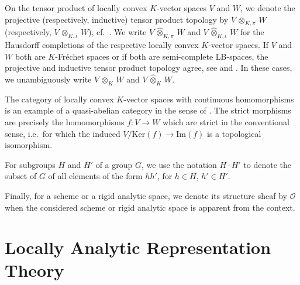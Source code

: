 \documentclass[a4paper, reqno, 10pt]{amsart}
\theoremstyle{definition}
\numberwithin{equation}{section}
\newcommand{\botimes}[1]{{\,\otimes_{#1}\,}}
\newcommand{\cotimes}[1]{{\,\widehat{\otimes}_{#1}\,}}
\renewcommand{\Im}{{\mathrm{Im}}}
\newcommand{\indotimes}{{\,\otimes_{K,\iota}\,}}
\newcommand{\indcotimes}{{\,\widehat{\otimes}_{K,\iota}\,}}
\newcommand{\Ker}{{\mathrm{Ker}}}
\newcommand{\projotimes}{{\,\otimes_{K,\pi}\,}}
\newcommand{\projcotimes}{{\,\widehat{\otimes}_{K,\pi}\,}}
\newcommand{\ra}{\rightarrow}
\newcommand{\CO}{{\mathcal {O}}}
\begin{document}
On the tensor product of locally convex $K$-vector spaces $V$ and $W$, we denote the projective (respectively, inductive) tensor product topology by $V \projotimes W$ (respectively, $V \indotimes W$), cf.\ \cite[\S 17]{Schneider02NonArchFunctAna}.
We write $V \projcotimes W$ and $V \indcotimes W$ for the Hausdorff completions of the respective locally convex $K$-vector spaces.
If $V$ and $W$ both are $K$-Fr\'echet spaces or if both are semi-complete LB-spaces, the projective and inductive tensor product topology agree, see \cite[Prop.\ 17.6]{Schneider02NonArchFunctAna} and \cite[Prop.\ 1.1.31]{Emerton17LocAnVect}.
In these cases, we unambiguously write $V \botimes{K} W$ and $V\cotimes{K} W$.



The category of locally convex $K$-vector spaces with continuous homomorphisms is an example of a quasi-abelian category in the sense of \cite{Schneiders98QuasiAbCat}.
The strict morphisms are precisely the homomorphisms $f\colon V \ra W$ which are strict in the conventional sense, i.e.\ for which the induced $V/\Ker(f) \ra \Im(f)$ is a topological isomorphism.



For subgroups $H$ and $H'$ of a group $G$, we use the notation $H \cdot H'$ to denote the subset of $G$ of all elements of the form $h h'$, for $h\in H$, $h' \in H'$.



Finally, for a scheme or a rigid analytic space, we denote its structure sheaf by $\CO$ when the considered scheme or rigid analytic space is apparent from the context.


















\setcounter{section}{0}


\section{Locally Analytic Representation Theory}


\end{document}
